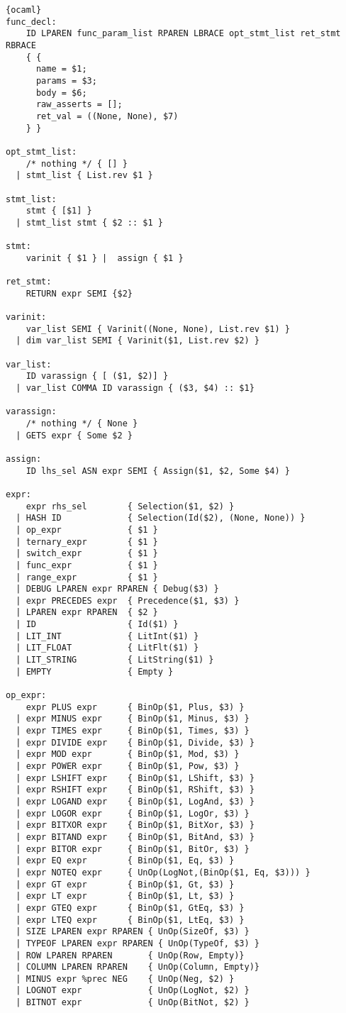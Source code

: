 \begin{lstlisting}{ocaml}
func_decl:
    ID LPAREN func_param_list RPAREN LBRACE opt_stmt_list ret_stmt RBRACE
    { {
      name = $1;
      params = $3;
      body = $6;
      raw_asserts = [];
      ret_val = ((None, None), $7)
    } }

opt_stmt_list:
    /* nothing */ { [] }
  | stmt_list { List.rev $1 }

stmt_list:
    stmt { [$1] }
  | stmt_list stmt { $2 :: $1 }

stmt:
    varinit { $1 } |  assign { $1 }

ret_stmt:
    RETURN expr SEMI {$2}

varinit:
    var_list SEMI { Varinit((None, None), List.rev $1) }
  | dim var_list SEMI { Varinit($1, List.rev $2) }

var_list:
    ID varassign { [ ($1, $2)] }
  | var_list COMMA ID varassign { ($3, $4) :: $1}

varassign:
    /* nothing */ { None }
  | GETS expr { Some $2 }

assign:
    ID lhs_sel ASN expr SEMI { Assign($1, $2, Some $4) }

expr:
    expr rhs_sel        { Selection($1, $2) }
  | HASH ID             { Selection(Id($2), (None, None)) }
  | op_expr             { $1 }
  | ternary_expr        { $1 }
  | switch_expr         { $1 }
  | func_expr           { $1 }
  | range_expr          { $1 }
  | DEBUG LPAREN expr RPAREN { Debug($3) }
  | expr PRECEDES expr  { Precedence($1, $3) }
  | LPAREN expr RPAREN  { $2 }
  | ID                  { Id($1) }
  | LIT_INT             { LitInt($1) }
  | LIT_FLOAT           { LitFlt($1) }
  | LIT_STRING          { LitString($1) }
  | EMPTY               { Empty }

op_expr:
    expr PLUS expr      { BinOp($1, Plus, $3) }
  | expr MINUS expr     { BinOp($1, Minus, $3) }
  | expr TIMES expr     { BinOp($1, Times, $3) }
  | expr DIVIDE expr    { BinOp($1, Divide, $3) }
  | expr MOD expr       { BinOp($1, Mod, $3) }
  | expr POWER expr     { BinOp($1, Pow, $3) }
  | expr LSHIFT expr    { BinOp($1, LShift, $3) }
  | expr RSHIFT expr    { BinOp($1, RShift, $3) }
  | expr LOGAND expr    { BinOp($1, LogAnd, $3) }
  | expr LOGOR expr     { BinOp($1, LogOr, $3) }
  | expr BITXOR expr    { BinOp($1, BitXor, $3) }
  | expr BITAND expr    { BinOp($1, BitAnd, $3) }
  | expr BITOR expr     { BinOp($1, BitOr, $3) }
  | expr EQ expr        { BinOp($1, Eq, $3) }
  | expr NOTEQ expr     { UnOp(LogNot,(BinOp($1, Eq, $3))) }
  | expr GT expr        { BinOp($1, Gt, $3) }
  | expr LT expr        { BinOp($1, Lt, $3) }
  | expr GTEQ expr      { BinOp($1, GtEq, $3) }
  | expr LTEQ expr      { BinOp($1, LtEq, $3) }
  | SIZE LPAREN expr RPAREN { UnOp(SizeOf, $3) }
  | TYPEOF LPAREN expr RPAREN { UnOp(TypeOf, $3) }
  | ROW LPAREN RPAREN       { UnOp(Row, Empty)}
  | COLUMN LPAREN RPAREN    { UnOp(Column, Empty)}
  | MINUS expr %prec NEG    { UnOp(Neg, $2) }
  | LOGNOT expr             { UnOp(LogNot, $2) }
  | BITNOT expr             { UnOp(BitNot, $2) }


\end{lstlisting}
